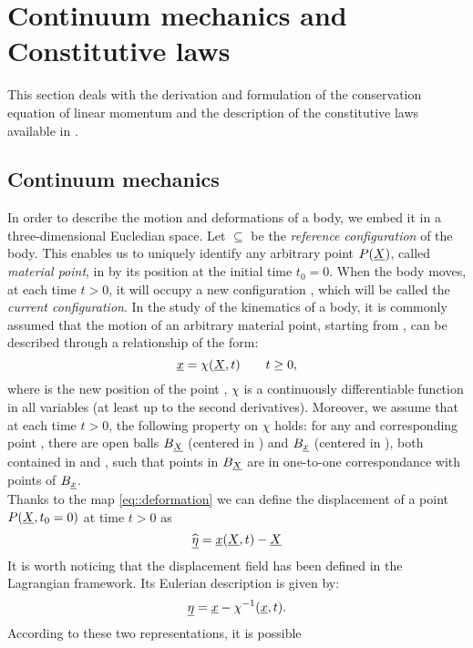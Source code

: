 \section{Continuum mechanics and Constitutive laws} This section deals
with the derivation and formulation of the conservation equation of
linear momentum and the description of the constitutive laws available
in \LV.

\subsection{Continuum mechanics}
\label{sct-Continuum} In order to describe the motion and deformations
of a body, we embed it in a three-dimensional Eucledian space. Let
\RefCon $\subseteq$ \Real be the \textit{reference configuration} of
the body. This enables us to uniquely identify any arbitrary point
$P(\underline{X})$, called \textit{material point}, in \RefCon by its position
at the initial time $t_0=0$. When the body moves, at each time $t>0$,
it will occupy a new configuration \CurCon, which will be called the
\textit{current configuration}. In the study of the kinematics of a
body, it is commonly assumed that the motion of an arbitrary material
point, starting from \pos, can be described through a relationship of
the form:
\begin{equation} \underline{x}=\chi(\underline{X},t)\qquad t\geq0,
  \label{eq::deformation}
\end{equation} where \npos is the new position of the point \pos,
$\chi$ is a continuously differentiable function in all variables (at
least up to the second derivatives). Moreover, we assume that at each
time $t>0$, the following property on $\chi$ holds: for any \pos and
corresponding point \npos, there are open balls $B_{\underline{X}}$ (centered
in \pos) and $B_{\underline{x}}$ (centered in \npos), both contained in
\RefCon and \CurCon, such that points in $B_{\underline{X}}$ are in one-to-one
correspondance with points of $B_{\underline{x}}$.\\ Thanks to the map
\eqref{eq::deformation} we can define the displacement of a point
$P(\underline{X},t_0=0)$ at time $t>0$ as
\begin{equation} \widehat{\underline{\eta}}=\underline{x}(\underline{X},t)-\underline{X}
  \label{eq::displacementL}
\end{equation} It is worth noticing that the displacement field has
been defined in the Lagrangian framework. Its Eulerian description is
given by:
\begin{equation} \underline{\eta}=\underline{x}-\chi^{-1}(\underline{x},t).
  \label{eq::displacementE}
\end{equation} According to these two representations, it is possible
